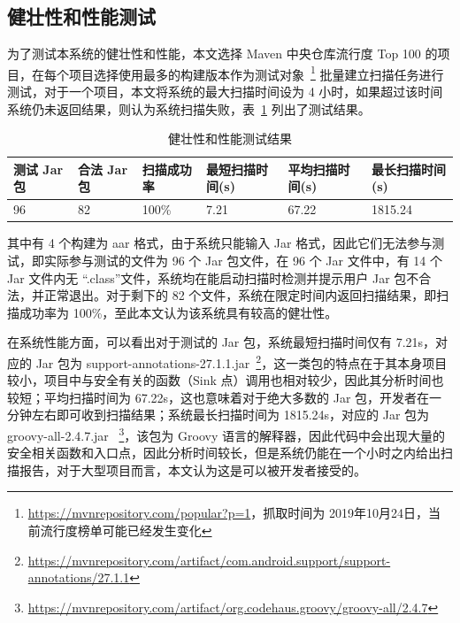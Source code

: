 \subsection{健壮性和性能测试}

为了测试本系统的健壮性和性能，本文选择 Maven 中央仓库流行度 Top 100 的项目，在每个项目选择使用最多的构建版本作为测试对象~\footnote{\url{https://mvnrepository.com/popular?p=1}，抓取时间为 2019年10月24日，当前流行度榜单可能已经发生变化} 批量建立扫描任务进行测试，对于一个项目，本文将系统的最大扫描时间设为 4 小时，如果超过该时间系统仍未返回结果，则认为系统扫描失败，表~\ref{robustTest} 列出了测试结果。

\begin{table}[!htb]\footnotesize
    \centering
    \caption{健壮性和性能测试结果}
    \begin{tabular}{llllll}
        \toprule
        \textbf{测试 Jar 包}&\textbf{合法 Jar 包} & \textbf{扫描成功率} &\textbf{最短扫描时间(s)}&\textbf{平均扫描时间(s)} & \textbf{最长扫描时间(s)} \\
        \midrule
        96 & 82 & 100\%  & 7.21 & 67.22 &1815.24 \\
        \bottomrule
    \end{tabular}
    \label{robustTest}
\end{table}

其中有 4 个构建为 aar 格式，由于系统只能输入 Jar 格式，因此它们无法参与测试，即实际参与测试的文件为 96 个 Jar 包文件，在 96 个 Jar 文件中，有 14 个Jar 文件内无 “.class”文件，系统均在能启动扫描时检测并提示用户 Jar 包不合法，并正常退出。对于剩下的 82 个文件，系统在限定时间内返回扫描结果，即扫描成功率为 100\%，至此本文认为该系统具有较高的健壮性。

在系统性能方面，可以看出对于测试的 Jar 包，系统最短扫描时间仅有 7.21s，对应的 Jar 包为 support-annotations-27.1.1.jar~\footnote{\url{https://mvnrepository.com/artifact/com.android.support/support-annotations/27.1.1}}，这一类包的特点在于其本身项目较小，项目中与安全有关的函数（Sink 点）调用也相对较少，因此其分析时间也较短；平均扫描时间为 67.22s，这也意味着对于绝大多数的 Jar 包，开发者在一分钟左右即可收到扫描结果；系统最长扫描时间为 1815.24s，对应的 Jar 包为 groovy-all-2.4.7.jar ~\footnote{\url{https://mvnrepository.com/artifact/org.codehaus.groovy/groovy-all/2.4.7}}，该包为 Groovy 语言的解释器，因此代码中会出现大量的安全相关函数和入口点，因此分析时间较长，但是系统仍能在一个小时之内给出扫描报告，对于大型项目而言，本文认为这是可以被开发者接受的。

